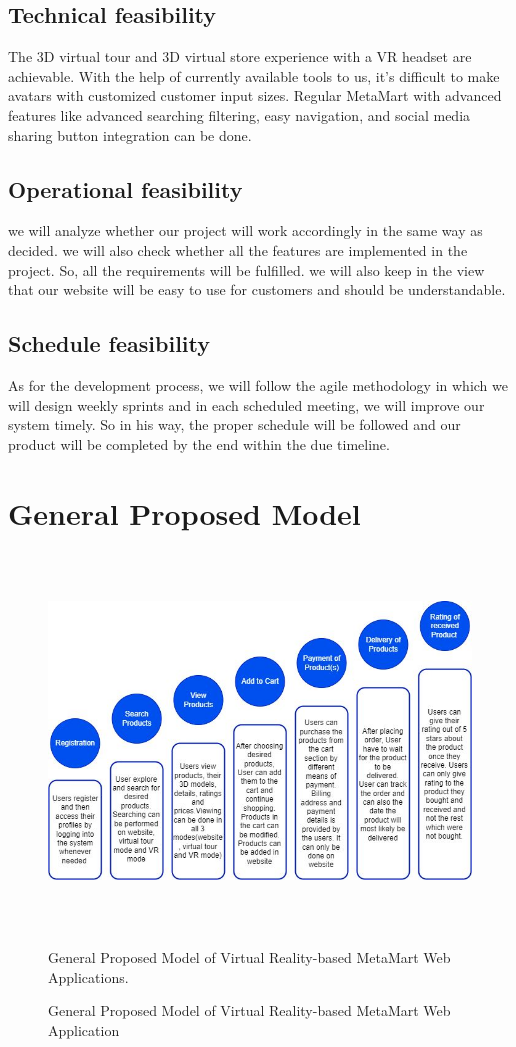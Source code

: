 \subsection{Technical feasibility}
The 3D virtual tour and 3D virtual store experience with a VR headset are achievable. With the help of currently available tools to us, it's difficult to make avatars with customized customer input sizes. Regular MetaMart with advanced features like advanced searching filtering, easy navigation, and social media sharing button integration can be done.

\subsection{Operational feasibility}
we will analyze whether our project will work accordingly in the same way as decided. we will also check whether all the features are implemented in the project. So, all the requirements will be fulfilled. we will also keep in the view that our website will be easy to use for customers and should be understandable.

\subsection{	Schedule feasibility}
As for the development process, we will follow the agile methodology in which we will design weekly sprints and in each scheduled meeting, we will improve our system timely. So in his way, the proper schedule will be followed and our product will be completed by the end within the due timeline.

\section{General Proposed Model}
\begin{figure}[H]
    \centering
    \includegraphics[width=15cm,height=10cm]{Figures/Diagrams/GeneralProposedModel.jpeg}
    \caption{General Proposed Model
     of Virtual Reality-based MetaMart Web Application
     }
    \label{fig: General Proposed Model}
   General Proposed Model
     of Virtual Reality-based MetaMart Web Applications.
\end{figure}
